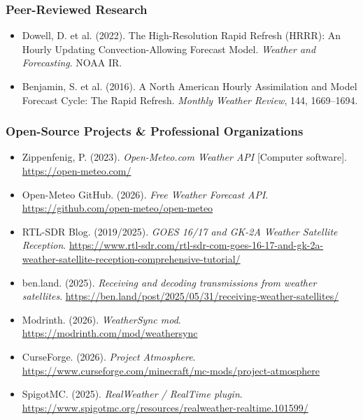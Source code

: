 \documentclass[11pt,letterpaper]{article}
\newcommand{\stageheader}[2]{%
  \noindent\colorbox{#2}{\makebox[\textwidth][l]{%
    \textcolor{white}{\bfseries\sffamily\hspace{6pt}#1\hspace{6pt}}}}%
  \vspace{0.5em}\par%
}
\begin{document}
\subsubsection{Peer-Reviewed Research}
\begin{itemize}[noitemsep]
  \item Dowell, D. et al. (2022). The High-Resolution Rapid Refresh (HRRR): An Hourly Updating Convection-Allowing Forecast Model. \textit{Weather and Forecasting}. NOAA IR.
  \item Benjamin, S. et al. (2016). A North American Hourly Assimilation and Model Forecast Cycle: The Rapid Refresh. \textit{Monthly Weather Review}, 144, 1669--1694.
\end{itemize}

\subsubsection{Open-Source Projects \& Professional Organizations}
\begin{itemize}[noitemsep]
  \item Zippenfenig, P. (2023). \textit{Open-Meteo.com Weather API} [Computer software]. \url{https://open-meteo.com/}
  \item Open-Meteo GitHub. (2026). \textit{Free Weather Forecast API}. \url{https://github.com/open-meteo/open-meteo}
  \item RTL-SDR Blog. (2019/2025). \textit{GOES 16/17 and GK-2A Weather Satellite Reception}. \url{https://www.rtl-sdr.com/rtl-sdr-com-goes-16-17-and-gk-2a-weather-satellite-reception-comprehensive-tutorial/}
  \item ben.land. (2025). \textit{Receiving and decoding transmissions from weather satellites}. \url{https://ben.land/post/2025/05/31/receiving-weather-satellites/}
  \item Modrinth. (2026). \textit{WeatherSync mod}. \url{https://modrinth.com/mod/weathersync}
  \item CurseForge. (2026). \textit{Project Atmosphere}. \url{https://www.curseforge.com/minecraft/mc-mods/project-atmosphere}
  \item SpigotMC. (2025). \textit{RealWeather / RealTime plugin}. \url{https://www.spigotmc.org/resources/realweather-realtime.101599/}
\end{itemize}

\newpage

\stageheader{STAGE 3 --- MISSION PACKAGE}{tertiary}
\end{document}
